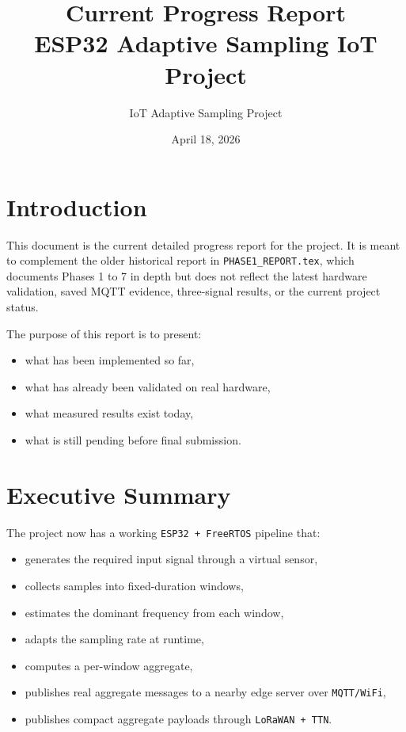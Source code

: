 \documentclass[12pt,a4paper]{article}
\title{Current Progress Report\\ESP32 Adaptive Sampling IoT Project}
\author{IoT Adaptive Sampling Project}
\date{April 18, 2026}
\begin{document}
\maketitle

\section{Introduction}

This document is the current detailed progress report for the project. It is
meant to complement the older historical report in
\texttt{PHASE1\_REPORT.tex}, which documents Phases 1 to 7 in depth but does
not reflect the latest hardware validation, saved MQTT evidence, three-signal
results, or the current project status.

The purpose of this report is to present:

\begin{itemize}
    \item what has been implemented so far,
    \item what has already been validated on real hardware,
    \item what measured results exist today,
    \item what is still pending before final submission.
\end{itemize}

\section{Executive Summary}

The project now has a working \texttt{ESP32 + FreeRTOS} pipeline that:

\begin{itemize}
    \item generates the required input signal through a virtual sensor,
    \item collects samples into fixed-duration windows,
    \item estimates the dominant frequency from each window,
    \item adapts the sampling rate at runtime,
    \item computes a per-window aggregate,
    \item publishes real aggregate messages to a nearby edge server over
    \texttt{MQTT/WiFi},
    \item publishes compact aggregate payloads through \texttt{LoRaWAN + TTN}.
\end{itemize}
\end{document}
